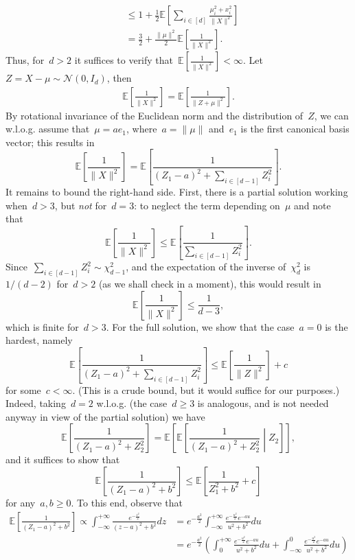 \documentclass[11pt]{article}
\newcommand{\E}{\mathds{E}}
\newcommand{\cN}{\mathcal{N}}
\newcommand{\leqs}{\leqslant}
\newcommand{\geqs}{\geqslant}
\renewcommand{\le}{\leqs}
\renewcommand{\ge}{\geqs}
\begin{document}
\begin{itemize}
{\[\begin{aligned}
&\le 1 + \frac{1}{2} \E \left [ \sum_{i \in [d]}\frac{\mu_i^2 + x_i^2}{\|X\|^2} \right] \\
&= \frac{3}{2} + \frac{\|\mu\|^2}{2} \E \left[\frac{1}{\|X\|^2} \right]. 
\end{aligned}
\]
Thus, for~$d > 2$ it suffices to verify that~$\E \left[\frac{1}{\|X\|^2} \right] < \infty$. 
Let~$Z = X - \mu \sim \cN(0,I_d)$, then
\[
\begin{aligned}
\E \left[\frac{1}{\|X\|^2} \right] 
=  \E \left[\frac{1}{\|Z + \mu\|^2} \right].
\end{aligned}
\]
By rotational invariance of the Euclidean norm and the distribution of~$Z$, we can w.l.o.g. assume that~$\mu = a e_1$, where~$a = \|\mu\|$ and~$e_1$ is the first canonical basis vector; this results in
\[
\E \left[\frac{1}{\|X\|^2} \right] = \E \left[\frac{1}{(Z_1 - a)^2 + \sum_{i \in [d-1]}  Z_i^2} \right].
\]
It remains to bound the right-hand side. 
First, there is a partial solution working when~$d > 3$, but {\em not} for~$d = 3$: to neglect the term depending on~$\mu$ and note that
\[
\E \left[\frac{1}{\|X\|^2} \right] 
\le \E \left[\frac{1}{\sum_{i \in [d-1]}  Z_i^2} \right].
\] 
Since~$\sum_{i \in [d-1]}  Z_i^2 \sim \chi_{d-1}^2$, and the expectation of the inverse of~$\chi_d^2$ is~$1/(d-2)$ for~$d > 2$ (as we shall check in a moment), this would result in
\[
\E \left[\frac{1}{\|X\|^2} \right] \le \frac{1}{d-3},
\]
which is finite for~$d > 3$. 
For the full solution, we show that the case~$a = 0$ is the hardest, namely
\[
\E \left[\frac{1}{(Z_1 - a)^2 + \sum_{i \in [d-1]}  Z_i^2} \right] 
\le \E \left[\frac{1}{\|Z\|^2} \right] + c
\]
for some~$c < \infty$. (This is a crude bound, but it would suffice for our purposes.)
Indeed, taking~$d = 2$ w.l.o.g. (the case~$d \ge 3$ is analogous, and is not needed anyway in view of the partial solution) we have
\[
\E \left[\frac{1}{(Z_1 - a)^2 + Z_2^2} \right] 
= \E \left[\E \left[\frac{1}{(Z_1 - a)^2 + Z_2^2} \middle| Z_2 \right] \right],
\]
and it suffices to show that
\[
\E \left[\frac{1}{(Z_1 - a)^2 + b^2}\right] \le \E \left[\frac{1}{Z_1^2 + b^2} + c\right]
\]
for any~$a, b \ge 0$. To this end, observe that 
\[
\begin{aligned}
\E \left[\frac{1}{(Z_1 - a)^2 + b^2}\right] 
\propto \int_{- \infty}^{+\infty} \frac{e^{-\frac{z^2}{2}}}{(z - a)^2 + b^2} dz
&= e^{-\frac{a^2}{2}}\int_{- \infty}^{+\infty} \frac{e^{-\frac{u^2}{2}} e^{-au}}{u^2 + b^2} du  \\
&= e^{-\frac{a^2}{2}} \left( \int_{0}^{+\infty} \frac{e^{-\frac{u^2}{2}} e^{-au}}{u^2 + b^2} du + \int_{- \infty}^{0} \frac{e^{-\frac{u^2}{2}} e^{-au}}{u^2 + b^2} du \right) \\

\end{aligned}\]}
\end{itemize}
\end{document}
